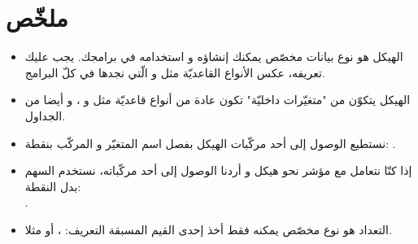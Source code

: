 \section*{ملخّص}

\begin{itemize}
  \item الهيكل هو نوع بيانات مخصّص يمكنك إنشاؤه و استخدامه في برامجك. يجب عليك تعريفه، عكس الأنواع القاعديّة مثل
و
الّتي نجدها في كلّ البرامج.
  \item الهيكل يتكوّن من "متغيّرات داخليّة" تكون عادة من أنواع قاعديّة مثل
و
،
و أيضا من الجداول.
  \item نستطيع الوصول إلى أحد مركّبات الهيكل بفصل اسم المتغيّر و المركّب بنقطة:
.
  \item إذا كنّا نتعامل مع مؤشر نحو هيكل و أردنا الوصول إلى أحد مركّباته، نستخدم السهم بدل النقطة:\\
.
  \item التعداد هو نوع مخصّص يمكنه فقط أخذ إحدى القيم المسبقة التعريف:
،
أو
مثلا.
\end{itemize}
